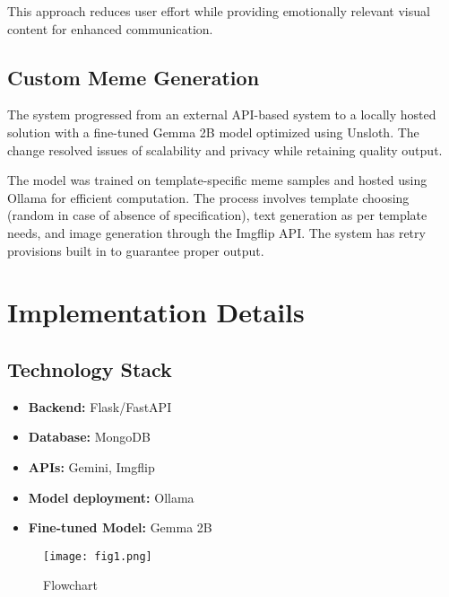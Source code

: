 \documentclass[conference]{IEEEtran}
\begin{document}
This approach reduces user effort while providing emotionally relevant visual content for enhanced communication.

\subsection{Custom Meme Generation}
The system progressed from an external API-based system to a locally hosted solution with a fine-tuned Gemma 2B model optimized using Unsloth. The change resolved issues of scalability and privacy while retaining quality output.

The model was trained on template-specific meme samples and hosted using Ollama for efficient computation. The process involves template choosing (random in case of absence of specification), text generation as per template needs, and image generation through the Imgflip API. The system has retry provisions built in to guarantee proper output.

% 

\section{Implementation Details}

\subsection{Technology Stack}
\begin{itemize}
    \item \textbf{Backend:} Flask/FastAPI
    \item \textbf{Database:} MongoDB
    \item \textbf{APIs:} Gemini, Imgflip
    \item \textbf{Model deployment:} Ollama
    \item \textbf{Fine-tuned Model:} Gemma 2B
\end{itemize}

\begin{figure}[htbp]
\centerline{\texttt{[image: fig1.png]}}
\caption{Flowchart}
\label{fig}
\end{figure}
\end{document}
